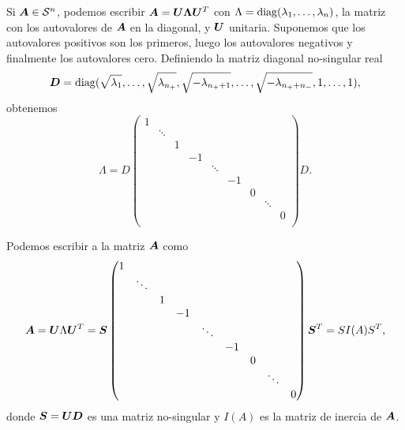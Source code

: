 Si $\bm{A} \in {\mathcal S^n}$, podemos escribir $\bm{A} = \bm{U} \bm{\Lambda} \bm{U}^T$ con $\Lambda = \operatorname{diag}(\lambda_1, \dots, \lambda_n)$, la matriz con los autovalores de $\bm{A}$ en la diagonal, y $\bm{U}$ unitaria. Suponemos que los autovalores positivos son los primeros, luego los autovalores negativos y finalmente los autovalores cero. Definiendo la matriz diagonal no-singular real
$$\bm{D} = \operatorname{diag}(\sqrt{\lambda_1}, \dots, \sqrt{\lambda_{n_+}}, \sqrt{-\lambda_{n_{+}+1}}, \dots, \sqrt{-\lambda_{n_{+}+n_{-}}}, 1, \dots, 1),$$
obtenemos
$$
\Lambda = D \begin{pmatrix}
1 &        &   &    &        &    &   &        &   \\
  & \ddots &   &    &        &    &   &        &   \\
  &        & 1 &    &        &    &   &        &   \\
  &        &   & -1 &        &    &   &        &   \\
  &        &   &    & \ddots &    &   &        &   \\
  &        &   &    &        & -1 &   &        &   \\
  &        &   &    &        &    & 0 &        &   \\
  &        &   &    &        &    &   & \ddots &   \\
  &        &   &    &        &    &   &        & 0 \\
\end{pmatrix}
D.$$

Podemos escribir a la matriz $\bm{A}$ como
$$
\bm{A} = \bm{U} \Lambda \bm{U}^T = \bm{S}
\begin{pmatrix}
1 &        &   &    &        &    &   &        &   \\
  & \ddots &   &    &        &    &   &        &   \\
  &        & 1 &    &        &    &   &        &   \\
  &        &   & -1 &        &    &   &        &   \\
  &        &   &    & \ddots &    &   &        &   \\
  &        &   &    &        & -1 &   &        &   \\
  &        &   &    &        &    & 0 &        &   \\
  &        &   &    &        &    &   & \ddots &   \\
  &        &   &    &        &    &   &        & 0 \\
\end{pmatrix}
\bm{S}^T = S I(A) S^T,$$
donde $\bm{S} = \bm{U} \bm{D}$ es una matriz no-singular y $I(A)$ es la matriz de inercia de $\bm{A}$.

